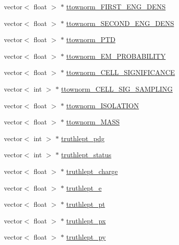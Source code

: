 \begin{DoxyCompactItemize}
\item 
vector$<$ float $>$ $\ast$ \hyperlink{classXMLWriter_a47e7df9ac545083cd0297063120a4728}{ttownorm\+\_\+\+F\+I\+R\+S\+T\+\_\+\+E\+N\+G\+\_\+\+D\+E\+NS}
\item 
vector$<$ float $>$ $\ast$ \hyperlink{classXMLWriter_ac2396b97dd99d4f9b8da5f98057588c5}{ttownorm\+\_\+\+S\+E\+C\+O\+N\+D\+\_\+\+E\+N\+G\+\_\+\+D\+E\+NS}
\item 
vector$<$ float $>$ $\ast$ \hyperlink{classXMLWriter_a19c4fccdbdb8ed24fe266658bd4385af}{ttownorm\+\_\+\+P\+TD}
\item 
vector$<$ float $>$ $\ast$ \hyperlink{classXMLWriter_a630f09b0504d4be109735ec60ed918ac}{ttownorm\+\_\+\+E\+M\+\_\+\+P\+R\+O\+B\+A\+B\+I\+L\+I\+TY}
\item 
vector$<$ float $>$ $\ast$ \hyperlink{classXMLWriter_ae54fb0a076fe7cfd4c6a3261ca2f40a8}{ttownorm\+\_\+\+C\+E\+L\+L\+\_\+\+S\+I\+G\+N\+I\+F\+I\+C\+A\+N\+CE}
\item 
vector$<$ int $>$ $\ast$ \hyperlink{classXMLWriter_a199a46a1cd7f4cab50f4f7a7f235fc35}{ttownorm\+\_\+\+C\+E\+L\+L\+\_\+\+S\+I\+G\+\_\+\+S\+A\+M\+P\+L\+I\+NG}
\item 
vector$<$ float $>$ $\ast$ \hyperlink{classXMLWriter_a73c6a5424450d93788736f689a15bcb3}{ttownorm\+\_\+\+I\+S\+O\+L\+A\+T\+I\+ON}
\item 
vector$<$ float $>$ $\ast$ \hyperlink{classXMLWriter_a2ca1461b7ea6cc2fb2fd237b1a67453c}{ttownorm\+\_\+\+M\+A\+SS}
\item 
vector$<$ int $>$ $\ast$ \hyperlink{classXMLWriter_ad0b054b4f5138a2537e159b14425e562}{truthlept\+\_\+pdg}
\item 
vector$<$ int $>$ $\ast$ \hyperlink{classXMLWriter_a907d6c289c9df93c32d14fffbb7340ad}{truthlept\+\_\+status}
\item 
vector$<$ float $>$ $\ast$ \hyperlink{classXMLWriter_a4777c0c7286933b77f06edce74b1eb33}{truthlept\+\_\+charge}
\item 
vector$<$ float $>$ $\ast$ \hyperlink{classXMLWriter_a671ccb030f4182ef924738885b472fcc}{truthlept\+\_\+e}
\item 
vector$<$ float $>$ $\ast$ \hyperlink{classXMLWriter_a7a08a947a6f2ba0b9e5b40d40425c4f6}{truthlept\+\_\+pt}
\item 
vector$<$ float $>$ $\ast$ \hyperlink{classXMLWriter_a7ff39afa6e567a72f8582d88c8683439}{truthlept\+\_\+px}
\item 
vector$<$ float $>$ $\ast$ \hyperlink{classXMLWriter_a5a972e6f379e61278037beb6620e17cc}{truthlept\+\_\+py}
\item 

\end{DoxyCompactItemize}
